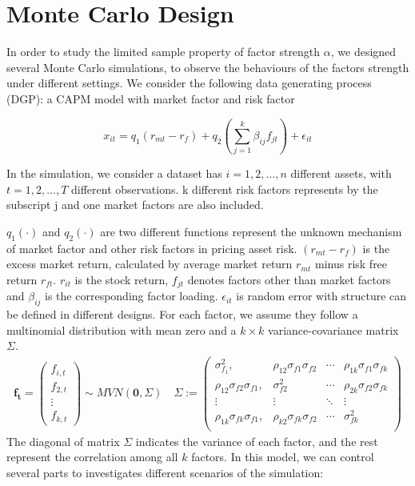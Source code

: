 \documentclass[12pt]{article}
\begin{document}
	\section{Monte Carlo Design}\label{MC}
In order to study the limited sample property of factor strength $\alpha$, we designed several Monte Carlo simulations, to observe the behaviours of the factors strength under different settings. 
We consider the following data generating process (DGP): a CAPM model with market factor and risk factor

\[ x_{it} = q_1({r_{mt}} - r_f) + q_2( \sum_{j=1}^k\beta_{ij}f_{jt}) +\epsilon_{it}  \]

In the simulation, we consider a dataset has $i = 1, 2,\dots, n$ different assets, with $t= 1, 2,\dots, T$ different observations. 
k different risk factors represents by the subscript j and one market factors are also included.

$q_1(\cdot)$ and $q_2(\cdot)$ are two different functions represent the unknown mechanism of market factor and other risk factors in pricing asset risk.
$({r_{mt}}- r_f) $ is the excess market return, calculated by average market  return ${r_{mt}}$ minus risk free return $r_{ft}$. 
$r_{it}$ is the stock return, $f_{jt}$ denotes factors other than market factors and $\beta_{ij}$ is the corresponding factor loading. 
$\epsilon_{it}$ is random error with structure can be defined in different designs.
 For each factor, we assume they follow a multinomial distribution with mean zero and a $k\times k$ variance-covariance matrix $\Sigma$. 
\begin{align*}
\mathbf{f_t} = \begin{pmatrix}
f_{i,t}\\f_{2,t}\\\vdots\\f_{k,t}
\end{pmatrix} \sim MVN(\mathbf{0}, \Sigma) \quad
 \Sigma := 
\begin{pmatrix}
\sigma^2_{f_1}, & \rho_{12}\sigma_{f1}\sigma_{f2} &\cdots  & \rho_{1k}\sigma_{f1}\sigma_{fk}\\
\rho_{12}\sigma_{f2}\sigma_{f1}, & \sigma^2_{f2} &\cdots  & \rho_{2k}\sigma_{f2}\sigma_{fk}\\
\vdots & \vdots & \ddots & \vdots \\
\rho_{1k}\sigma_{fk}\sigma_{f1}, & \rho_{k2}\sigma_{fk}\sigma_{f2} &\cdots  & \sigma^2_{fk}\\
\end{pmatrix}
\end{align*}
The diagonal of matrix $\Sigma$ indicates the variance of each factor, and the rest represent the correlation among all $k$ factors.
In this model, we can control several parts to investigates different scenarios of the simulation:
\end{document}
